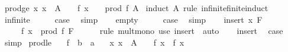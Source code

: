 \begin{isabellebody}
\isanewline
\isanewline
{}\isamarkupfalse%
\ prod{\isacharunderscore}{\kern0pt}ge{\isacharunderscore}{\kern0pt}{}{\isacharcolon}{\kern0pt}\ {\isachardoublequoteopen}{\isacharparenleft}{\kern0pt}{\isasymAnd}x{\isachardot}{\kern0pt}\ x\ {\isasymin}\ A\ {\isasymLongrightarrow}\ {}\ {\isasymle}\ f\ x{\isacharparenright}{\kern0pt}\ {\isasymLongrightarrow}\ {}\ {\isasymle}\ prod\ f\ A{\isachardoublequoteclose}\isanewline
%
\isadelimproof
%
\endisadelimproof
%
\isatagproof
{}\isamarkupfalse%
\ {\isacharparenleft}{\kern0pt}induct\ A\ rule{\isacharcolon}{\kern0pt}\ infinite{\isacharunderscore}{\kern0pt}finite{\isacharunderscore}{\kern0pt}induct{\isacharparenright}{\kern0pt}\isanewline
\ \ \isamarkupfalse%
\ infinite\isanewline
\ \ \isamarkupfalse%
\ \isamarkupfalse%
\ {\isacharquery}{\kern0pt}case\ \isamarkupfalse%
\ simp\isanewline
{}\isamarkupfalse%
\isanewline
\ \ \isamarkupfalse%
\ empty\isanewline
\ \ \isamarkupfalse%
\ \isamarkupfalse%
\ {\isacharquery}{\kern0pt}case\ \isamarkupfalse%
\ simp\isanewline
{}\isamarkupfalse%
\isanewline
\ \ \isamarkupfalse%
\ {\isacharparenleft}{\kern0pt}insert\ x\ F{\isacharparenright}{\kern0pt}\isanewline
\ \ \isamarkupfalse%
\ {\isachardoublequoteopen}{}\ {\isacharasterisk}{\kern0pt}\ {}\ {\isasymle}\ f\ x\ {\isacharasterisk}{\kern0pt}\ prod\ f\ F{\isachardoublequoteclose}\isanewline
\ \ \ \ \isamarkupfalse%
\ {\isacharparenleft}{\kern0pt}rule\ mult{\isacharunderscore}{\kern0pt}mono{\isacharprime}{\kern0pt}{\isacharparenright}{\kern0pt}\ {\isacharparenleft}{\kern0pt}use\ insert\ \ auto{\isacharparenright}{\kern0pt}\isanewline
\ \ \isamarkupfalse%
\ insert\ \isamarkupfalse%
\ {\isacharquery}{\kern0pt}case\ \isamarkupfalse%
\ simp\isanewline
{}\isamarkupfalse%
%
\endisatagproof
{\isafoldproof}%
%
\isadelimproof
\isanewline
%
\endisadelimproof
\isanewline
{}\isamarkupfalse%
\ prod{\isacharunderscore}{\kern0pt}le{\isacharunderscore}{\kern0pt}{}{\isacharcolon}{\kern0pt}\isanewline
\ \ \ f\ {\isacharcolon}{\kern0pt}{\isacharcolon}{\kern0pt}\ {\isachardoublequoteopen}{\isacharprime}{\kern0pt}b\ {\isasymRightarrow}\ {\isacharprime}{\kern0pt}a{\isachardoublequoteclose}\isanewline
\ \ \ {\isachardoublequoteopen}{\isasymAnd}x{\isachardot}{\kern0pt}\ x\ {\isasymin}\ A\ {\isasymLongrightarrow}\ {}\ {\isasymle}\ f\ x\ {\isasymand}\ f\ x\ {\isasymle}\ {}{\isachardoublequoteclose}\isanewline

\end{isabellebody}
